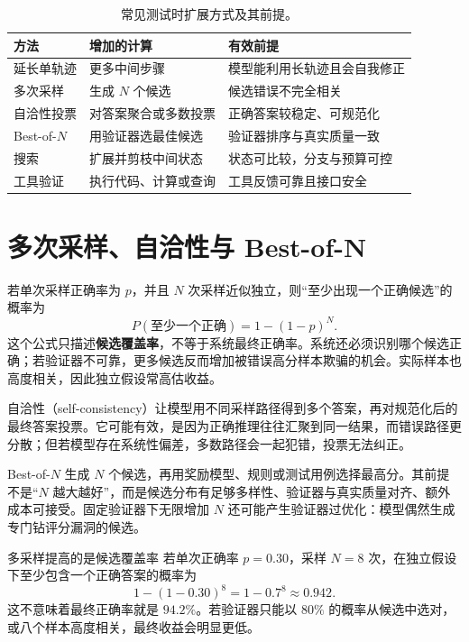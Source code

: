 \begin{table}[htbp]
\centering
\small
\begin{tabularx}{0.96\textwidth}{lYY}
\toprule
方法 & 增加的计算 & 有效前提\\
\midrule
延长单轨迹 & 更多中间步骤 & 模型能利用长轨迹且会自我修正\\
多次采样 & 生成 $N$ 个候选 & 候选错误不完全相关\\
自洽性投票 & 对答案聚合或多数投票 & 正确答案较稳定、可规范化\\
Best-of-$N$ & 用验证器选最佳候选 & 验证器排序与真实质量一致\\
搜索 & 扩展并剪枝中间状态 & 状态可比较，分支与预算可控\\
工具验证 & 执行代码、计算或查询 & 工具反馈可靠且接口安全\\
\bottomrule
\end{tabularx}
\caption{常见测试时扩展方式及其前提。}
\end{table}

\section{多次采样、自洽性与 Best-of-N}

若单次采样正确率为 $p$，并且 $N$ 次采样近似独立，则“至少出现一个正确候选”的概率为
\[
P(\text{至少一个正确})=1-(1-p)^N.
\]
这个公式只描述\textbf{候选覆盖率}，不等于系统最终正确率。系统还必须识别哪个候选正确；若验证器不可靠，更多候选反而增加被错误高分样本欺骗的机会。实际样本也高度相关，因此独立假设常高估收益。

自洽性（self-consistency）让模型用不同采样路径得到多个答案，再对规范化后的最终答案投票。它可能有效，是因为正确推理往往汇聚到同一结果，而错误路径更分散；但若模型存在系统性偏差，多数路径会一起犯错，投票无法纠正。

Best-of-$N$ 生成 $N$ 个候选，再用奖励模型、规则或测试用例选择最高分。其前提不是“$N$ 越大越好”，而是候选分布有足够多样性、验证器与真实质量对齐、额外成本可接受。固定验证器下无限增加 $N$ 还可能产生验证器过优化：模型偶然生成专门钻评分漏洞的候选。

\begin{exercisebox}{多采样提高的是候选覆盖率}
若单次正确率 $p=0.30$，采样 $N=8$ 次，在独立假设下至少包含一个正确答案的概率为
\[
1-(1-0.30)^8=1-0.7^8\approx0.942.
\]
这不意味着最终正确率就是 $94.2\%$。若验证器只能以 $80\%$ 的概率从候选中选对，或八个样本高度相关，最终收益会明显更低。
\end{exercisebox}


